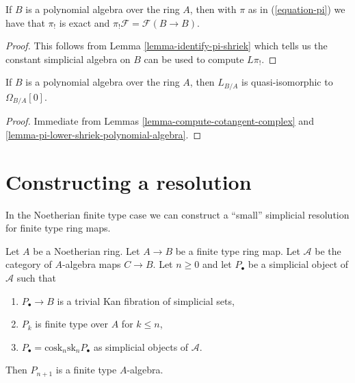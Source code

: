 \begin{lemma}
\label{lemma-pi-lower-shriek-polynomial-algebra}
If $B$ is a polynomial algebra over the ring $A$, then
with $\pi$ as in (\ref{equation-pi}) we have that
$\pi_!$ is exact and $\pi_!\mathcal{F} = \mathcal{F}(B \to B)$.
\end{lemma}

\begin{proof}
This follows from Lemma \ref{lemma-identify-pi-shriek} which tells us
the constant simplicial algebra on $B$ can be used to compute $L\pi_!$.
\end{proof}

\begin{lemma}
\label{lemma-cotangent-complex-polynomial-algebra}
If $B$ is a polynomial algebra over the ring $A$, then
$L_{B/A}$ is quasi-isomorphic to $\Omega_{B/A}[0]$.
\end{lemma}

\begin{proof}
Immediate from
Lemmas \ref{lemma-compute-cotangent-complex} and
\ref{lemma-pi-lower-shriek-polynomial-algebra}.
\end{proof}





\section{Constructing a resolution}
\label{section-polynomial}

\noindent
In the Noetherian finite type case we can construct a ``small'' simplicial
resolution for finite type ring maps.

\begin{lemma}
\label{lemma-polynomial}
Let $A$ be a Noetherian ring. Let $A \to B$ be a finite type ring map.
Let $\mathcal{A}$ be the category of $A$-algebra maps $C \to B$. Let
$n \geq 0$ and let $P_\bullet$ be a simplicial object of $\mathcal{A}$
such that
\begin{enumerate}
\item $P_\bullet \to B$ is a trivial Kan fibration of simplicial sets,
\item $P_k$ is finite type over $A$ for $k \leq n$,
\item $P_\bullet = \text{cosk}_n \text{sk}_n P_\bullet$ as simplicial
objects of $\mathcal{A}$.
\end{enumerate}
Then $P_{n + 1}$ is a finite type $A$-algebra.
\end{lemma}

